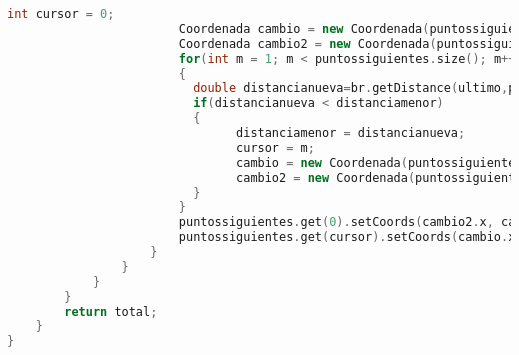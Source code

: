 \begin{lstlisting}[language=C++, caption=Algoritmo Base del Método de Cuadrantes, label=lst:codigo11,escapechar=|]
						int cursor = 0;                            
						Coordenada cambio = new Coordenada(puntossiguientes.get(cursor).x,puntossiguientes.get(cursor).y);  
						Coordenada cambio2 = new Coordenada(puntossiguientes.get(0).x, puntossiguientes.get(0).y);
						for(int m = 1; m < puntossiguientes.size(); m++)
						{
						  double distancianueva=br.getDistance(ultimo,puntossiguientes.get(m));
						  if(distancianueva < distanciamenor)
						  {                               
								distanciamenor = distancianueva;
								cursor = m;
								cambio = new Coordenada(puntossiguientes.get(0).x, puntossiguientes.get(0).y);
								cambio2 = new Coordenada(puntossiguientes.get(cursor).x,puntossiguientes.get(cursor).y);                       
						  }
						}
						puntossiguientes.get(0).setCoords(cambio2.x, cambio2.y);
						puntossiguientes.get(cursor).setCoords(cambio.x, cambio.y);                         
					}
				}   
			}
		}   
		return total;
	}	
}
\end{lstlisting}  